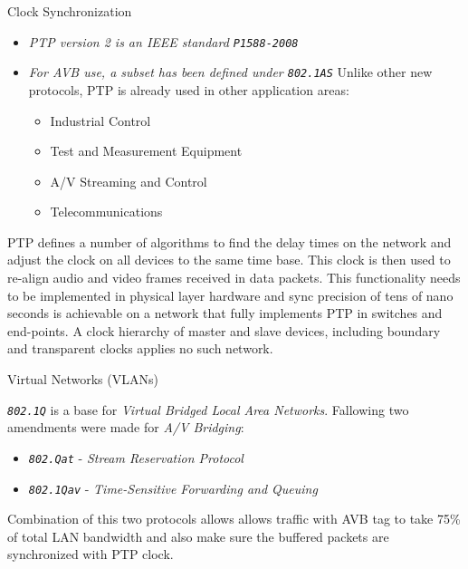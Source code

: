 \documentclass{beamer}
\begin{document}
\begin{frame}[allowframebreaks]{ Clock Synchronization }

\begin{itemize}
	\item \emph{ PTP version 2 is an IEEE standard \texttt{P1588-2008} }
	\item \emph{ For AVB use, a subset has been defined under \texttt{802.1AS} }
Unlike other new protocols, \newline PTP is already used in other application areas:

\begin{itemize}
	\item Industrial Control
	\item Test and Measurement Equipment
	\item A/V Streaming and Control
	\item Telecommunications
\end{itemize}

\end{itemize}

\break

{ PTP defines a number of algorithms to find the delay times on the network
and adjust the clock on all devices to the same time base. This clock is then
used to re-align audio and video frames received in data packets.
This functionality needs to be implemented in physical layer hardware and
sync precision of tens of nano seconds is achievable on a network that fully
implements PTP in switches and end-points. A clock hierarchy of master and
slave devices, including boundary and transparent clocks applies no such network. }

\end{frame}


\begin{frame}{ Virtual Networks (VLANs)}

\emph{\texttt{802.1Q}} is a base for \emph{Virtual Bridged Local Area Networks}.
Fallowing two amendments were made for \emph{A/V Bridging}:
\begin{itemize}
	\item \emph{\texttt{802.Qat}} - \emph{Stream Reservation Protocol}
	\item \emph{\texttt{802.1Qav}} - \emph{Time-Sensitive Forwarding and Queuing}
\end{itemize}

{ Combination of this two protocols allows allows traffic with AVB tag to take 75\% of total
LAN bandwidth and also make sure the buffered packets are synchronized with PTP clock. }

\end{frame}
\end{document}
